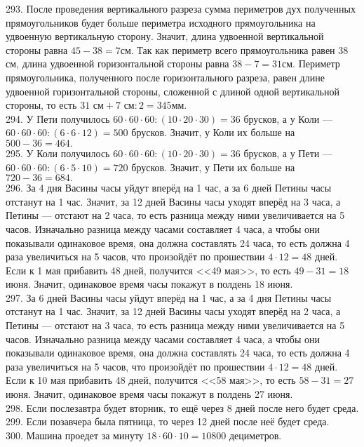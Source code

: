 293. После проведения вертикального разреза сумма периметров дух полученных прямоугольников будет больше периметра исходного прямоугольника на удвоенную вертикальную сторону. Значит, длина удвоенной вертикальной стороны равна $45-38=7$см. Так как периметр всего прямоугольника равен 38 см, длина удвоенной горизонтальной стороны равна $38-7=31$см. Периметр прямоугольника, полученного после горизонтального разреза, равен длине удвоенной горизонтальной стороны, сложенной с длиной одной вертикальной стороны, то есть $31\text{ см}+7\text{ см}:2=345$мм.\\
294. У Пети получилось $60\cdot60\cdot60:(10\cdot20\cdot30)=36$ брусков, а у Коли --- $60\cdot60\cdot60:(6\cdot6\cdot12)=500$ брусков. Значит, у Коли их больше на $500-36=464.$\\
295. У Коли получилось $60\cdot60\cdot60:(10\cdot20\cdot30)=36$ брусков, а у Пети --- $60\cdot60\cdot60:(6\cdot5\cdot10)=720$ брусков. Значит, у Пети их больше на $720-36=684.$\\
296. За 4 дня Васины часы уйдут вперёд на 1 час, а за 6 дней Петины часы отстанут на 1 час. Значит, за 12 дней Васины часы уходят вперёд на 3 часа, а Петины --- отстают на 2 часа, то есть разница между ними увеличивается на 5 часов. Изначально разница между часами составляет 4 часа, а чтобы они показывали одинаковое время, она должна составлять 24 часа, то есть должна 4 раза увеличиться на 5 часов, что произойдёт по прошествии $4\cdot12=48$ дней. Если к 1 мая прибавить 48 дней, получится <<49 мая>>, то есть $49-31=18$ июня. Значит, одинаковое время часы покажут в полдень 18 июня.\\
297. За 6 дней Васины часы уйдут вперёд на 1 час, а за 4 дня Петины часы отстанут на 1 час. Значит, за 12 дней Васины часы уходят вперёд на 2 часа, а Петины --- отстают на 3 часа, то есть разница между ними увеличивается на 5 часов. Изначально разница между часами составляет 4 часа, а чтобы они показывали одинаковое время, она должна составлять 24 часа, то есть должна 4 раза увеличиться на 5 часов, что произойдёт по прошествии $4\cdot12=48$ дней. Если к 10 мая прибавить 48 дней, получится <<58 мая>>, то есть $58-31=27$ июня. Значит, одинаковое время часы покажут в полдень 27 июня.\\
298. Если послезавтра будет вторник, то ещё через 8 дней после него будет среда.\\
299. Если позавчера была пятница, то через 12 дней после неё будет среда.\\
300. Машина проедет за минуту $18\cdot60\cdot10=10800$ дециметров.\\
